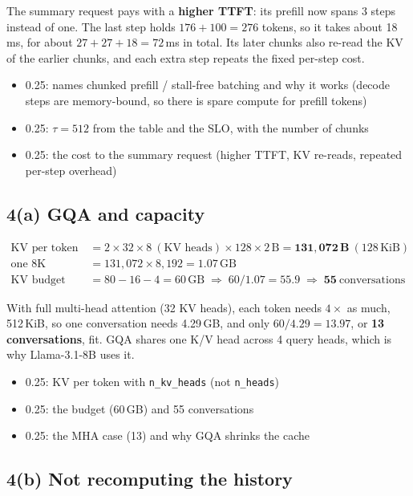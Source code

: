 \documentclass[10pt]{article}
\newenvironment{rubric}{%
  \begin{tcolorbox}[colback=black!4, colframe=black!40, boxrule=0.4pt,
                    arc=0pt, title={Rubric}, fonttitle=\bfseries\small,
                    coltitle=black, colbacktitle=black!12]
  \small\begin{itemize}[leftmargin=*, nosep]}{%
  \end{itemize}\end{tcolorbox}}
\begin{document}
The summary request pays with a \textbf{higher TTFT}: its prefill now
spans 3 steps instead of one. The last step holds $176 + 100 = 276$
tokens, so it takes about 18\,ms, for about $27 + 27 + 18 = 72$\,ms in
total. Its later chunks also re-read the KV of the earlier chunks, and
each extra step repeats the fixed per-step cost.

\begin{rubric}
\item 0.25: names chunked prefill / stall-free batching and why it works
  (decode steps are memory-bound, so there is spare compute for prefill
  tokens)
\item 0.25: $\tau = 512$ from the table and the SLO, with the number of
  chunks
\item 0.25: the cost to the summary request (higher TTFT, KV re-reads,
  repeated per-step overhead)
\end{rubric}

\subsection*{4(a) GQA and capacity}

\begin{align*}
\text{KV per token} &= 2 \times 32 \times 8\ (\text{KV heads}) \times 128
  \times 2\,\text{B} = \mathbf{131{,}072\,B}\ (128\,\text{KiB}) \\
\text{one 8K conversation} &= 131{,}072 \times 8{,}192 = 1.07\,\text{GB} \\
\text{KV budget} &= 80 - 16 - 4 = 60\,\text{GB}
  \;\Rightarrow\; 60 / 1.07 = 55.9 \;\Rightarrow\; \mathbf{55}\ \text{conversations}
\end{align*}

With full multi-head attention (32 KV heads), each token needs
\textbf{$4\times$} as much, 512\,KiB, so one conversation needs 4.29\,GB,
and only $60 / 4.29 = 13.97$, or \textbf{13 conversations}, fit. GQA
shares one K/V head across 4 query heads, which is why Llama-3.1-8B uses
it.

\begin{rubric}
\item 0.25: KV per token with \texttt{n\_kv\_heads} (not \texttt{n\_heads})
\item 0.25: the budget (60\,GB) and 55 conversations
\item 0.25: the MHA case (13) and why GQA shrinks the cache
\end{rubric}

\subsection*{4(b) Not recomputing the history}
\end{document}
